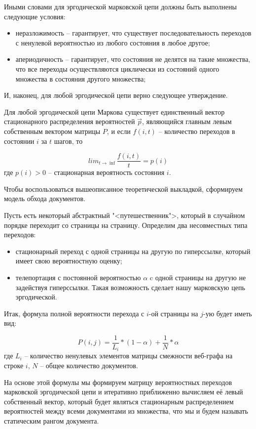 Иными словами для эргодической марковской цепи должны быть выполнены следующие условия:
\begin{itemize}
\item неразложимость -- гарантирует, что существует последовательность переходов с ненулевой вероятностью из любого состояния в любое другое;
\item апериодичность -- гарантирует, что состояния не делятся на такие множества, что все переходы осуществляются циклически из состояний одного множества в состояния другого множества;
\end{itemize}

И, наконец, для любой эргодической цепи верно следующее утверждение.

Для любой эргодической цепи Маркова существует единственный вектор стационарного распределения вероятностей $\vec{p}$, являющийся главным левым собственным вектором матрицы $P$, и если $f(i, t)$ -- количество переходов в состоянии $i$ за $t$ шагов, то 

\begin{equation}
lim_{t \to \inf}\frac{f(i, t)}{t}=p(i)
\end{equation} где $p(i) > 0$ -- стационарная вероятность состояния $i$.

Чтобы воспользоваться вышеописанное теоретической выкладкой, сформируем модель обхода документов.

Пусть есть некоторый абстрактный "<путешественник">, который в случайном порядке переходит со страницы на страницу.
Определим два несовместных типа переходов:
\begin{itemize}
\item стационарный переход с одной страницы на другую по гиперссылке, который имеет свою вероятностную оценку;
\item телепортация с постоянной вероятностью $\alpha$ c одной страницы на другую не задействуя гиперссылки. Такая возможность сделает нашу марковскую цепь эргодической.
\end{itemize}

Итак, формула полной вероятности перехода с $i$-ой страницы на $j$-ую будет иметь вид:

\begin{equation}
P(i, j) = \frac{1}{L_i} * (1 - \alpha) + \frac{1}{N} * \alpha
\end{equation} где $L_i$ -- количество ненулевых элементов матрицы смежности веб-графа на строке $i$, $N$ -- общее количество документов.

На основе этой формулы мы формируем матрицу вероятностных переходов марковской эргодической цепи и итеративно приближенно вычисляем её левый собственный вектор, который будет являться стационарным распределением вероятностей между всеми документами из множества, что мы и будем называть статическим рангом документа.

